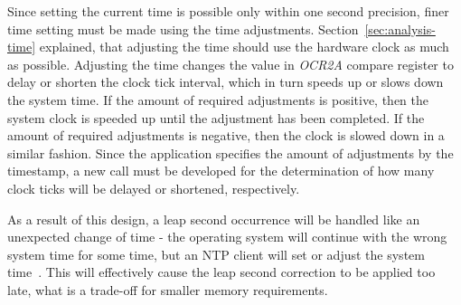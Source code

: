 Since setting the current time is possible only within one second precision,
finer time setting must be made using the time adjustments.
Section~\ref{sec:analysis-time} explained, that adjusting the time
should use the hardware clock as much as possible.
Adjusting the time changes the value in {\it{OCR2A}} compare register
to delay or shorten the clock tick interval,
which in turn speeds up or slows down the system time.
If the amount of required adjustments is positive, then the system clock is speeded up
until the adjustment has been completed.
If the amount of required adjustments is negative, then the clock is slowed down in a similar fashion.
Since the application specifies the amount of adjustments by the timestamp,
a new call must be developed for the determination of how many
clock ticks will be delayed or shortened, respectively.

As a result of this design, a leap second occurrence will be handled like an unexpected change of time -
the operating system will continue with the wrong system time for some time,
but an NTP client will set or adjust the system time~\cite{ntp-faq}.
This will effectively cause the leap second correction to be applied too late,
what is a trade-off for smaller memory requirements.

